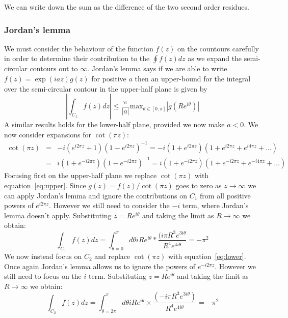We can write down the sum as the difference of the two second order residues.

\subsubsection{Jordan's lemma}
We must consider the behaviour of the function $f(z)$ on the countours carefully in order to determine their contribution to the $\oint f(z) dz$ as we expand the semi-circular contours out to $\infty$.  Jordan's lemma says if we are able to write $f(z) = \exp(iaz)g(z)$ for positive $a$ then an upper-bound for the integral over the semi-circular contour in the upper-half plane is given by
\begin{equation}
\left|\int_{C_{1}}f(z)dz\right| \leq \frac{\pi}{|a|}\text{max}_{\theta\in [0,\pi]}\left|g(Re^{i\theta})\right|
\end{equation}
A similar results holds for the lower-half plane, provided we now make $a<0$.  We now consider expansions for $\cot(\pi z)$:
\begin{eqnarray}
\cot(\pi z)&=&-i(e^{i2\pi z}+1)(1-e^{i2\pi z})^{-1}=-i(1+e^{i2\pi z})(1+e^{i2\pi z}+e^{i4\pi z}+\ldots)\label{eq:upper}\\
&=&i(1+e^{-i2\pi z})(1-e^{-i2\pi z})^{-1}=i(1+e^{-i2\pi z})(1+e^{-i2\pi z}+e^{-i4\pi z}+\ldots)\label{eq:lower}
\end{eqnarray}
Focusing first on the upper-half plane we replace $\cot(\pi z)$ with equation~\ref{eq:upper}.  Since $g(z)=f(z)/\cot(\pi z)$ goes to zero as $z\rightarrow\infty$ we can apply Jordan's lemma and ignore the contributions on $C_{1}$ from all positive powers of $e^{i2\pi z}$.  However we still need to consider the $-i$ term, where Jordan's lemma doesn't apply.  Substituting $z=Re^{i\theta}$ and taking the limit as $R\rightarrow\infty$ we obtain:
\begin{equation}
\int_{C_{1}}f(z)dz = \int_{\theta=0}^{\pi}d\theta iRe^{i\theta}*\frac{(i\pi R^{3}e^{3i\theta}}{R^{4}e^{4i\theta}} = -\pi^{2}
\end{equation}
We now instead focus on $C_{2}$ and replace $\cot(\pi z)$ with equation~\ref{eq:lower}.  Once again Jordan's lemma allows us to ignore the powers of $e^{-i2\pi z}$.  However we still need to focus on the $i$ term.  Substituting $z=Re^{i\theta}$ and taking the limit as $R\rightarrow\infty$ we obtain:
\begin{equation}
\int_{C_{2}}f(z)dz = \int_{\theta=2\pi}^{\pi}d\theta iRe^{i\theta}\times\frac{(-i\pi R^{3}e^{3i\theta})}{R^{4}e^{4i\theta}} = -\pi^{2}
\end{equation}


